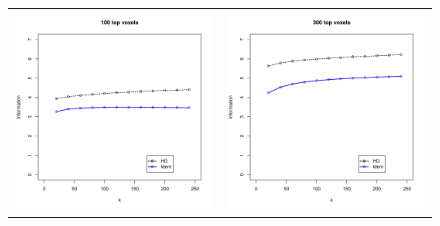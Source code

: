 \begin{figure}
\centering
\begin{tabular}{cc}
\includegraphics[scale = 0.4]{../../Yuval/ident_infer1_edited.pdf} &
\includegraphics[scale = 0.4]{../../Yuval/ident_infer3_edited.pdf} \\

\end{tabular}
\end{figure}
